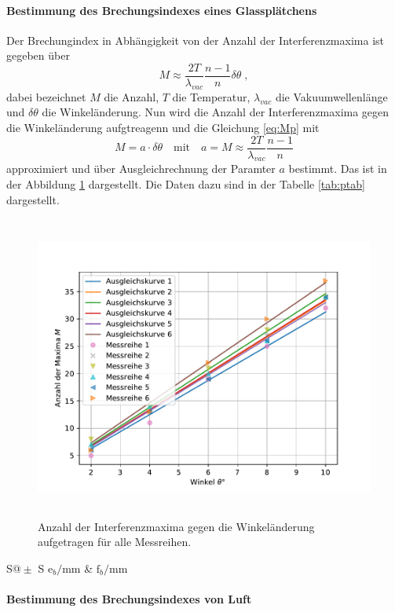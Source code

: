 \paragraph{Bestimmung des Brechungsindexes eines Glassplätchens}
Der Brechungindex in Abhängigkeit von der Anzahl der Interferenzmaxima ist gegeben über
\begin{equation}
M \approx \frac{2T}{\lambda_{vac}} \frac{n-1}{n} \delta \theta \;,
\label{eq:Mp}
\end{equation}
dabei bezeichnet $M$ die Anzahl, $T$ die Temperatur, $\lambda_{vac}$ die Vakuumwellenlänge und 
$\delta \theta$ die Winkeländerung.
Nun wird die Anzahl der Interferenzmaxima gegen die Winkeländerung aufgtreagenn und die Gleichung 
\eqref{eq:Mp} mit 
\begin{equation}
M = a \cdot \delta\theta \quad \text{mit} \quad a =M \approx \frac{2T}{\lambda_{vac}} \frac{n-1}{n}
\label{eq:pfit}
\end{equation}
approximiert und über Ausgleichrechnung der Paramter $a$ bestimmt. Das ist in der Abbildung 
\ref{fig:pfit} dargestellt. Die Daten dazu sind in der Tabelle \ref{tab:ptab} dargestellt.
\begin{figure}
  \centering
  \includegraphics[height = 10cm]{plots/Plaettchenplot.pdf}
  \caption{Anzahl der Interferenzmaxima gegen die Winkeländerung aufgetragen für alle Messreihen.}
  \label{fig:pfit}
\end{figure}
\begin{table}
 \centering
 \begin{tabular}{S@{${}\pm{}$} S}
   \toprule
    $\text{e}_b / \si{\milli\meter}$ &
    $\text{f}_b / \si{\milli\meter} $\\
   \midrule
   \bottomrule
 \end{tabular}
 \caption{Tabellenunterschrift}
 \label{tab:ptab}
\end{table}

\paragraph{Bestimmung des Brechungsindexes von Luft}
